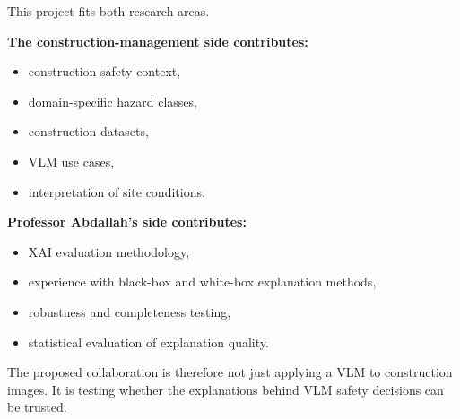 \documentclass[11pt,letterpaper]{article}
\begin{document}
This project fits both research areas.

\textbf{The construction-management side contributes:}
\begin{itemize}
  \item construction safety context,
  \item domain-specific hazard classes,
  \item construction datasets,
  \item VLM use cases,
  \item interpretation of site conditions.
\end{itemize}

\textbf{Professor Abdallah's side contributes:}
\begin{itemize}
  \item XAI evaluation methodology,
  \item experience with black-box and white-box explanation methods,
  \item robustness and completeness testing,
  \item statistical evaluation of explanation quality.
\end{itemize}

The proposed collaboration is therefore not just applying a VLM to construction images. It is testing whether the explanations behind VLM safety decisions can be trusted.
\end{document}
